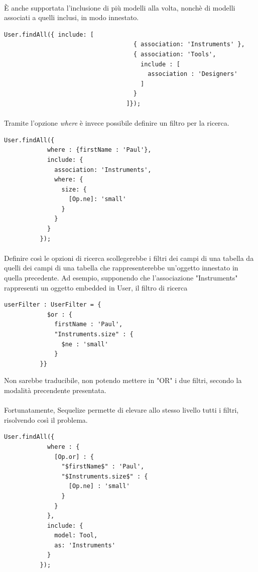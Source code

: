 \documentclass[a4paper, 12pt]{report}
\begin{document}
        \paragraph*{}
        È anche supportata l'inclusione di più modelli alla volta, nonchè di modelli associati a quelli inclusi, in modo innestato.
        \begin{Verbatim}[samepage=true]
          User.findAll({ include: [
                                    { association: 'Instruments' }, 
                                    { association: 'Tools', 
                                      include : [
                                        association : 'Designers'
                                      ]
                                    }
                                  ]});
        \end{Verbatim}
        \paragraph*{}
        Tramite l'opzione \emph{where} è invece possibile definire un filtro per la ricerca.
        \begin{Verbatim}[samepage=true]
          User.findAll({
            where : {firstName : 'Paul'},
            include: {
              association: 'Instruments',
              where: {
                size: {
                  [Op.ne]: 'small'
                }
              }
            }
          });
        \end{Verbatim}
        \paragraph*{}
        Definire così le opzioni di ricerca scollegerebbe i filtri dei campi di una tabella da quelli dei campi di una tabella che rappresenterebbe un'oggetto innestato in quella precedente.
        Ad esempio, supponendo che l'associazione "Instruments" rappresenti un oggetto embedded in User, il filtro di ricerca
        \begin{Verbatim}[samepage=true]
          userFilter : UserFilter = {
            $or : {
              firstName : 'Paul', 
              "Instruments.size" : {
                $ne : 'small'
              }
          }}
        \end{Verbatim}
        Non sarebbe traducibile, non potendo mettere in "OR" i due filtri, secondo la modalità precendente presentata.
        \paragraph*{} 
        Fortunatamente, Sequelize permette di elevare allo stesso livello tutti i filtri, risolvendo così il problema.
        \begin{Verbatim}[samepage=true]
          User.findAll({
            where : {
              [Op.or] : {
                "$firstName$" : 'Paul', 
                "$Instruments.size$" : {
                  [Op.ne] : 'small'
                }
              }
            },
            include: {
              model: Tool,
              as: 'Instruments'
            }
          });
        \end{Verbatim}
\end{document}
